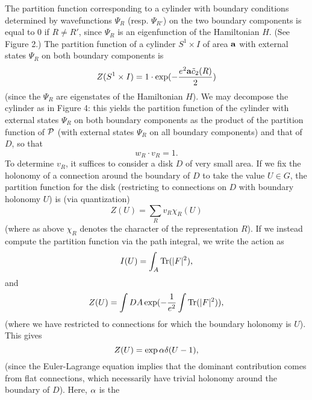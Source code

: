 \documentclass[12pt]{article}
\begin{document}
\begin{figure}
\centerline{}
\end{figure}

The partition function corresponding to a cylinder with boundary
conditions determined by wavefunctions $\Psi_R$ (resp. $\Psi_{R'}$) on
the two boundary components is equal to 0 if $R \ne R'$, since 
$\Psi_R$ is an eigenfunction of the Hamiltonian $H$. (See
Figure 2.)
The partition function  of a cylinder 
$S^1 \times I$ of area ${\bf a}$  with external states 
$\Psi_R$ on both boundary components is 
\begin{equation}
Z( S^1 \times I) = 1 \cdot 
\exp (  - \frac{e^2 {\bf a} \tilde{c}_2(R)} {2}  ) 
\end{equation}
(since the $\Psi_R$ are eigenstates of the Hamiltonian $H$). 
We may decompose the cylinder as in Figure 4:
this yields the partition function of the cylinder with external
states $\Psi_R$ on both  boundary components as the product of the
partition function of ${\cal P}$ (with external states $\Psi_R $ on 
all boundary components) and that of $D$, so that
\begin{equation}
w_R \cdot v_R = 1. 
\end{equation}
To determine $v_R$, it suffices to consider a disk $D$  of very small area.
If we fix the holonomy of a connection around the boundary of $D$ to take
the value $U \in G$, the partition function for the
disk (restricting to  connections on $D$ with boundary holonomy 
$U$) is (via quantization)
\begin{equation}
Z (U) = \sum_R v_R \chi_R (U) 
\end{equation}
(where as above  $\chi_R$ denotes the character of the
representation $R$). If we instead 
 compute the partition function via the
path integral, we write the action as
\begin{equation} 
I(U) = \int_{A} {\rm Tr} (|F|^2) ,
\end{equation}
and 
\begin{equation}
Z(U) = \int DA \exp ( - \frac{1}{e^2} 
\int {\rm Tr} (|F|^2)  ), 
\end{equation}
(where we have restricted to connections for which the 
boundary holonomy is $U$). This gives 
\begin{equation}
Z(U) = \exp{\alpha} \delta(U - 1), 
\end{equation}
(since the Euler-Lagrange equation implies that the dominant contribution
comes from flat connections, which necessarily have trivial holonomy
around the boundary of $D$). Here, $\alpha$ is the
\end{document}
